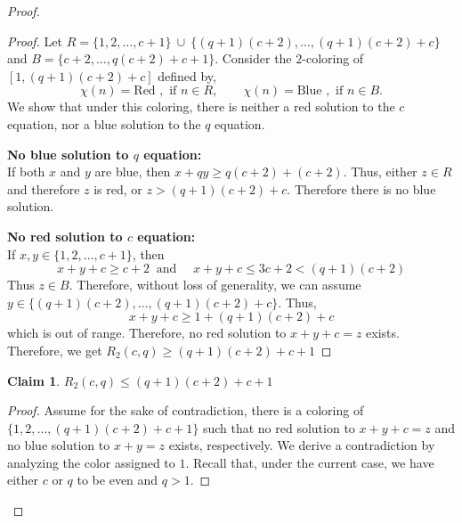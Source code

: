 \documentclass[preprint,12pt]{elsarticle}
\theoremstyle{plain}
\theoremstyle{definition}
\newtheorem{claim}[thm]{Claim}
\begin{document}
\begin{proof}
 \begin{proof} Let $R =  \{1,2,\dots, c+1\}\ \cup\ \{(q+1)(c+2),\dots,(q+1)(c+2)+c\}$ and $B = \{c+2,\dots,q(c+2)+c+1\}$. Consider the $2$-coloring of $[1,(q+1)(c+2)+c]$ defined by,
 $$
\chi(n) = \text{Red }, \text{ if $n \in R$},
\qquad
\chi(n) = \text{Blue }, \text{ if $n \in B$}.
$$
We show that under this coloring, there is neither a red solution to the $c$ equation, nor a blue solution to the $q$ equation.

\smallskip
\noindent\textbf{No blue solution to $q$ equation:}\\
 If both $x$ and $y$ are blue, then $x + qy \geq q(c+2) + (c+2)$. Thus, either $z \in R$ and therefore $z$ is red, or $z > (q+1)(c+2)+c$. Therefore there is no blue solution. 

\smallskip
\noindent\textbf{No red solution to $c$ equation:}\\
If $x, y \in \{1,2,\dots,c+1\}$, then $$x+y+c \geq c+2\ \text{ and }  \quad x+y+c \leq 3c+2 < (q+1)(c+2)$$ Thus $z \in B$. 
 Therefore, without loss of generality, we can assume $y \in  \{(q+1)(c+2),\dots,(q+1)(c+2)+c\}$. Thus,
    $$x+y +c \geq 1 + (q+1)(c+2) + c $$
which is out of range. Therefore, no red solution to $x+y+c=z$ exists.
Therefore, we get $R_2(c,q) \geq (q+1)(c+2)+c+1$  \end{proof}

\begin{claim}\label{clm3.4}
    $R_2(c,q) \leq (q+1)(c+2) + c +1$
\end{claim}
\begin{proof} Assume for the sake of contradiction, there is a coloring of $\{1,2,\dots,(q+1)(c+2)+c+1\}$ such that no red solution to $x+y+c=z$ and no blue solution to $x+y=z$ exists, respectively. We derive a
contradiction by analyzing the color assigned to $1$. Recall that, under the current case, we have either $c$ or $q$ to be even and $q >1$.


\end{proof}
\end{proof}
\end{document}
